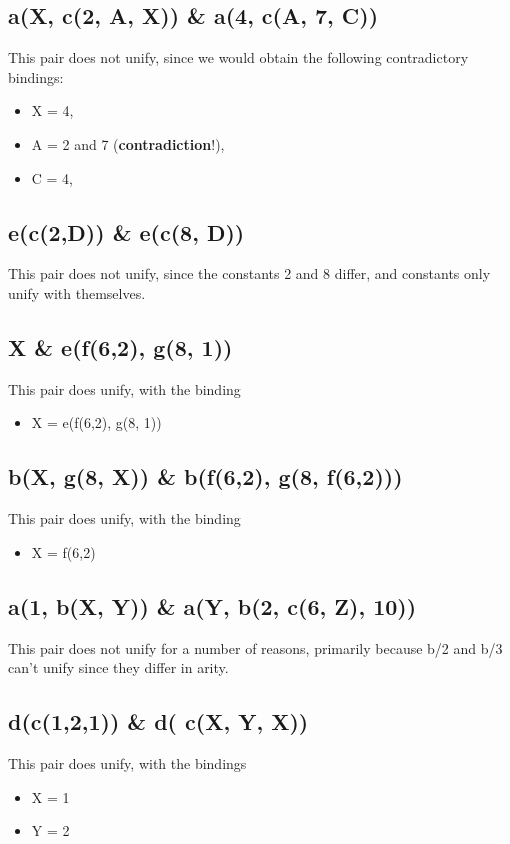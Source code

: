 \documentclass[paper=a4, fontsize=11pt]{scrartcl} %
\numberwithin{equation}{section} %
\numberwithin{figure}{section} %
\numberwithin{table}{section} %
\begin{document}
\subsection{a(X, c(2, A, X)) \& a(4, c(A, 7, C))}

This pair does not unify, since we would obtain the following contradictory bindings:
\begin{itemize}
\item X = 4,
\item A = 2 and 7 (\textbf{contradiction}!),
\item C = 4,
\end{itemize}

\subsection{e(c(2,D)) \& e(c(8, D))}

This pair does not unify, since the constants 2 and 8 differ, and constants only unify with themselves.

\subsection{X \& e(f(6,2), g(8, 1))}

This pair does unify, with the binding
\begin{itemize}
\item X = e(f(6,2), g(8, 1))
\end{itemize}

\subsection{b(X, g(8, X)) \& b(f(6,2), g(8, f(6,2)))}

This pair does unify, with the binding
\begin{itemize}
\item X = f(6,2)
\end{itemize}

\subsection{a(1, b(X, Y)) \& a(Y, b(2, c(6, Z), 10))}

This pair does not unify for  a number of reasons, primarily because b/2 and b/3 can't unify since they differ in arity. 

\subsection{d(c(1,2,1)) \& d( c(X, Y, X))}

This pair does unify, with the bindings
\begin{itemize}
\item X = 1
\item Y = 2
\end{itemize}


\end{document}
